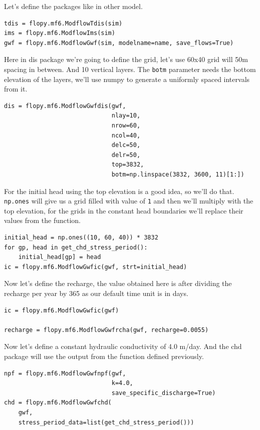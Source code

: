 \documentclass[titlepage,12pt]{unisubmission}
\begin{document}
Let's define the packages like in other model.

\begin{verbatim}
tdis = flopy.mf6.ModflowTdis(sim)
ims = flopy.mf6.ModflowIms(sim)
gwf = flopy.mf6.ModflowGwf(sim, modelname=name, save_flows=True)
\end{verbatim}

Here in dis package we're going to define the grid, let's use 60x40 grid will 50m spacing in between. And 10 vertical layers. The \texttt{botm} parameter needs the bottom elevation of the layers, we'll use numpy to generate a uniformly spaced intervals from it.

\begin{verbatim}
dis = flopy.mf6.ModflowGwfdis(gwf,
                              nlay=10,
                              nrow=60,
                              ncol=40,
                              delc=50,
                              delr=50,
                              top=3832,
                              botm=np.linspace(3832, 3600, 11)[1:])
\end{verbatim}

For the initial head using the top elevation is a good idea, so we'll do that. \texttt{np.ones} will give us a grid filled with value of \texttt{1} and then we'll multiply with the top elevation, for the grids in the constant head boundaries we'll replace their values from the function.

\begin{verbatim}
initial_head = np.ones((10, 60, 40)) * 3832
for gp, head in get_chd_stress_period():
    initial_head[gp] = head
ic = flopy.mf6.ModflowGwfic(gwf, strt=initial_head)
\end{verbatim}

Now let's define the recharge, the value obtained here is after dividing the recharge per year by 365 as our default time unit is in days.

\begin{verbatim}
ic = flopy.mf6.ModflowGwfic(gwf)

recharge = flopy.mf6.ModflowGwfrcha(gwf, recharge=0.0055)
\end{verbatim}

Now let's define a constant hydraulic conductivity of 4.0 m/day. And the chd package will use the output from the function defined previously.

\begin{verbatim}
npf = flopy.mf6.ModflowGwfnpf(gwf,
                              k=4.0,
                              save_specific_discharge=True)
chd = flopy.mf6.ModflowGwfchd(
    gwf,
    stress_period_data=list(get_chd_stress_period()))
\end{verbatim}
\end{document}
